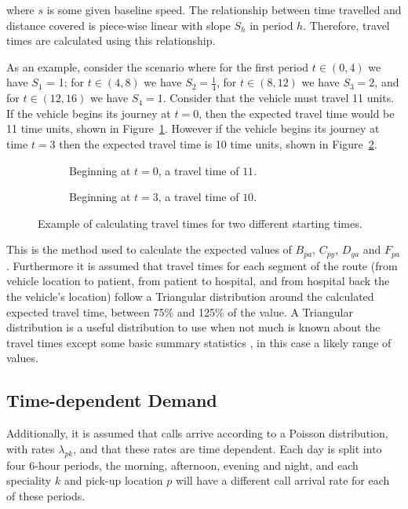\documentclass[numbers,webpdf,imaman]{ima-authoring-template}%
\begin{document}
\noindent
where $s$ is some given baseline speed. The relationship between time travelled
and distance covered is piece-wise linear with slope $S_h$ in period $h$.
Therefore, travel times are calculated using this relationship.

As an example, consider the scenario where for the first period $t \in (0, 4)$
we have $S_1$ = 1; for $t \in (4, 8)$ we have $S_2 = \frac{1}{4}$, for
$t \in (8, 12)$ we have $S_3 = 2$, and for $t \in (12, 16)$ we have $S_4 = 1$.
Consider that the vehicle must travel 11 units. If the vehicle begins its
journey at $t=0$, then the expected travel time would be 11 time units, shown
in Figure~\ref{fig:travel_times_1}. However if the vehicle begins its journey
at time $t=3$ then the expected travel time is 10 time units, shown in
Figure~\ref{fig:travel_times_2}.

\begin{figure}
    \begin{center}
    \begin{subfigure}{6.6cm}
    
    \caption{Beginning at $t=0$, a travel time of $11$.}
    \label{fig:travel_times_1}
    \end{subfigure}
    \begin{subfigure}{6.6cm}
    
    \caption{Beginning at $t=3$, a travel time of $10$.}
    \label{fig:travel_times_2}
    \end{subfigure}
    \end{center}
    \caption{Example of calculating travel times for two different starting
    times.}
    \label{fig:travel_times}
\end{figure}

This is the method used to calculate the expected values of $B_{pa}$, $C_{py}$,
$D_{ya}$ and $F_{pa}$.
Furthermore it is assumed that travel times for each segment of the route
(from vehicle location to patient, from patient to hospital, and from hospital
back the the vehicle's location) follow a Triangular distribution around the
calculated expected travel time, between 75\% and 125\% of the value.
A Triangular distribution is a useful distribution to use when
not much is known about the travel times except some basic summary statistics
\citep{robinson2014simulation}, in this case a likely range of values.


\subsection{Time-dependent Demand}
Additionally, it is assumed that calls arrive according to a Poisson
distribution, with rates $\lambda_{pk}$, and that these rates are time
dependent. Each day is split into four 6-hour periods, the morning, afternoon,
evening and night, and each speciality $k$ and pick-up location $p$ will have
a different call arrival rate for each of these periods.
\end{document}

